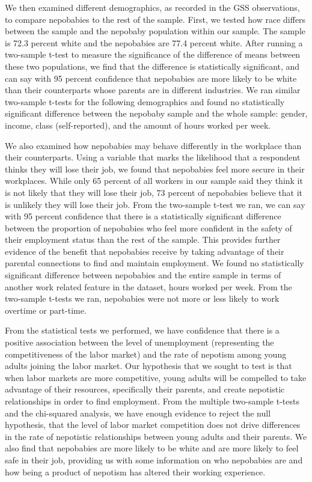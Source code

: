 \documentclass[12pt]{article}
\begin{document}
We then examined different demographics, as recorded in the GSS observations, to compare nepobabies to the rest of the sample. First, we tested how race differs between the sample and the nepobaby population within our sample. The sample is 72.3 percent white and the nepobabies are 77.4 percent white. After running a two-sample t-test to measure the significance of the difference of means between these two populations, we find that the difference is statistically significant, and can say with 95 percent confidence that nepobabies are more likely to be white than their counterparts whose parents are in different industries. We ran similar two-sample t-tests for the following demographics and found no statistically significant difference between the nepobaby sample and the whole sample: gender, income, class (self-reported), and the amount of hours worked per week. 

We also examined how nepobabies may behave differently in the workplace than their counterparts. Using a variable that marks the likelihood that a respondent thinks they will lose their job, we found that nepobabies feel more secure in their workplaces. While only 65 percent of all workers in our sample said they think it is not likely that they will lose their job, 73 percent of nepobabies believe that it is unlikely they will lose their job. From the two-sample t-test we ran, we can say with 95 percent confidence that there is a statistically significant difference between the proportion of nepobabies who feel more confident in the safety of their employment status than the rest of the sample. This provides further evidence of the benefit that nepobabies receive by taking advantage of their parental connections to find and maintain employment. We found no statistically significant difference between nepobabies and the entire sample in terms of another work related feature in the dataset, hours worked per week. From the two-sample t-tests we ran, nepobabies were not more or less likely to work overtime or part-time.

From the statistical tests we performed, we have confidence that there is a positive association between the level of unemployment (representing the competitiveness of the labor market) and the rate of nepotism among young adults joining the labor market. Our hypothesis that we sought to test is that when labor markets are more competitive, young adults will be compelled to take advantage of their resources, specifically their parents, and create nepotistic relationships in order to find employment. From the multiple two-sample t-tests and the chi-squared analysis, we have enough evidence to reject the null hypothesis, that the level of labor market competition does not drive differences in the rate of nepotistic relationships between young adults and their parents. We also find that nepobabies are more likely to be white and are more likely to feel safe in their job, providing us with some information on who nepobabies are and how being a product of nepotism has altered their working experience.
\end{document}
